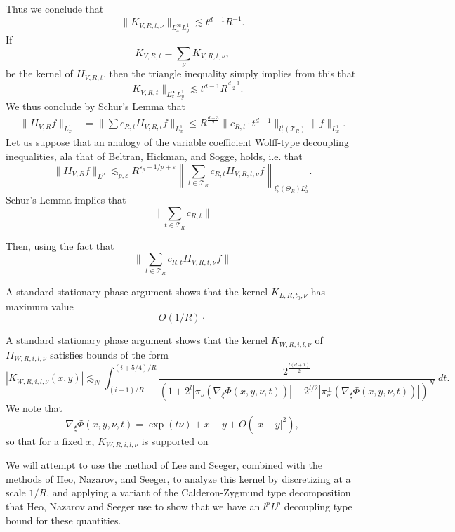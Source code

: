 Thus we conclude that
%
\[ \| K_{V,R,t,\nu} \|_{L^\infty_x L^1_y} \lesssim t^{d-1} R^{-1}. \]
%
If
%
\[ K_{V,R,t} = \sum_\nu K_{V,R,t,\nu}, \]
%
be the kernel of $II_{V,R,t}$, then the triangle inequality simply implies from this that
%
\[ \| K_{V,R,t} \|_{L^\infty_x L^1_y} \lesssim t^{d-1} R^{\frac{d-3}{2}}. \]
%
We thus conclude by Schur's Lemma that
%
\begin{align*}
    \| II_{V,R} f \|_{L^1_x} &= \| \sum c_{R,t} II_{V,R,t} f \|_{L^1_x} \leq R^{\frac{d-3}{2}} \| c_{R,t} \cdot t^{d-1} \|_{l^1_t(\mathcal{T}_R)} \| f \|_{L^1_x}.
\end{align*}
%
Let us suppose that an analogy of the variable coefficient Wolff-type decoupling inequalities, ala that of Beltran, Hickman, and Sogge, holds, i.e. that
%
\[ \| II_{V,R} f \|_{L^p} \lesssim_{p,\varepsilon} R^{s_p - 1/p + \varepsilon} \left\| \sum_{t \in \mathcal{T}_R} c_{R,t} II_{V,R,t,\nu} f \right\|_{l^p_\nu(\Theta_R) L^p_x}. \]
Schur's Lemma implies that
%
\[ \| \sum_{t \in \mathcal{T}_R} c_{R,t} \| \]

Then, using the fact that
%
\[ \| \sum_{t \in \mathcal{T}_R} c_{R,t} II_{V,R,t,\nu} f \| \]

A standard stationary phase argument shows that the kernel $K_{L,R,t_0,\nu}$ has maximum value
%
\[ O(1/R) \cdot  \]

A standard stationary phase argument shows that the kernel $K_{W,R,i,l,\nu}$ of $II_{W,R,i,l,\nu}$ satisfies bounds of the form
%
\[ |K_{W,R,i,l,\nu}(x,y)| \lesssim_N \int_{(i-1)/R}^{(i+5/4)/R} \frac{2^{\frac{l(d+1)}{2}}}{(1 + 2^l | \pi_\nu( \nabla_\xi \Phi(x,y,\nu,t) ) | + 2^{l/2} | \pi_\nu^\perp ( \nabla_\xi \Phi(x,y,\nu,t) ) | )^N}\; dt. \]
%
We note that
%
\[ \nabla_\xi \Phi(x,y,\nu,t) = \exp(t \nu) + x - y + O(|x - y|^2), \]
%
so that for a fixed $x$, $K_{W,R,i,l,\nu}$ is supported on 




We will attempt to use the method of Lee and Seeger, combined with the methods of Heo, Nazarov, and Seeger, to analyze this kernel by discretizing at a scale $1/R$, and applying a variant of the Calderon-Zygmund type decomposition that Heo, Nazarov and Seeger use to show that we have an $l^p L^p$ decoupling type bound for these quantities.

